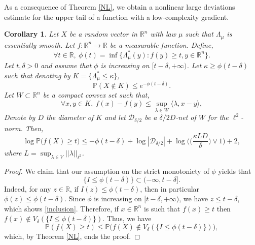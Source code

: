 \documentclass[aop,preprint]{imsart}
\newcommand\RR{\mathbb{R}}
\newcommand\PP{\mathbb{P}}
\numberwithin{equation}{section}
\theoremstyle{definition}
\theoremstyle{plain}
\newtheorem{Cor}[Def]{Corollary}
\theoremstyle{remark}
\begin{document}
As a consequence of Theorem \ref{NL}, we obtain a nonlinear large deviations estimate for the upper tail of a function with a low-complexity gradient.
\begin{Cor}\label{CorNL}
Let $X$ be a random vector in $\RR^n$ with law $\mu$ such that $\Lambda_\mu$ is essentially smooth. Let $f : \RR^n \to \RR$ be a measurable function. Define,
$$\forall t \in \RR, \  \phi(t) = \inf \{ \Lambda^*_{\mu}(y) : f(y)\geq  t, y \in \RR^n \}.$$
Let $t,\delta>0$ and assume that $\phi$ is increasing on $[t-\delta,+\infty)$. 
Let $\kappa\geq \phi(t-\delta)$ such that denoting by $K = \{ \Lambda^*_\mu \leq \kappa\}$,
\begin{equation} \label{tightness}\PP(X\notin  K)\leq e^{-\phi(t-\delta)}.\end{equation}
Let $W \subset \RR^n$ be a compact convex set such that, 
$$ \forall x,y \in K, \ f(x)-f(y) \leq \sup_{\lambda \in W} \langle \lambda, x-y\rangle,$$
Denote by $D$ the diameter of $K$ and let $\mathcal{D}_{\delta/2}$ be a $\delta/2D$-net of $W$ for the $\ell^2$-norm.
 Then, 
$$\log \PP\big( f(X) \geq t \big) \leq -\phi(t-\delta) +\log|\mathcal{D}_{\delta/2}|+ \log\Big(\Big( \frac{\kappa LD }{\delta}\Big)\vee 1\Big)  + 2,$$
where $L = \sup_{\lambda \in V} ||\lambda ||_{\ell^2}$.
\end{Cor}

\begin{proof}
We claim that our assumption on the strict monotonicty of $\phi$ yields that 
\begin{equation} \label{inclusion} \{ I\leq \phi(t-\delta)\}\subset (-\infty, t-\delta].\end{equation}
Indeed, for any $z \in \RR$, if $I(z) \leq \phi(t-\delta)$, then in particular $\phi(z)\leq \phi(t-\delta)$. Since $\phi$ is increasing on $[t-\delta,+\infty)$, we have $z \leq t-\delta$, which shows \eqref{inclusion}.
Therefore, if $x\in \RR^n$ is such that $f(x)\geq t$ then  $f(x)\notin V_\delta(\{ I\leq \phi(t-\delta)\})$. Thus, we have
$$ \PP( f(X) \geq t) \leq \PP\big( f(X) \notin V_\delta(\{ I\leq \phi(t-\delta)\})\big),$$
which, by Theorem \ref{NL}, ends the proof.
\end{proof}
\end{document}

